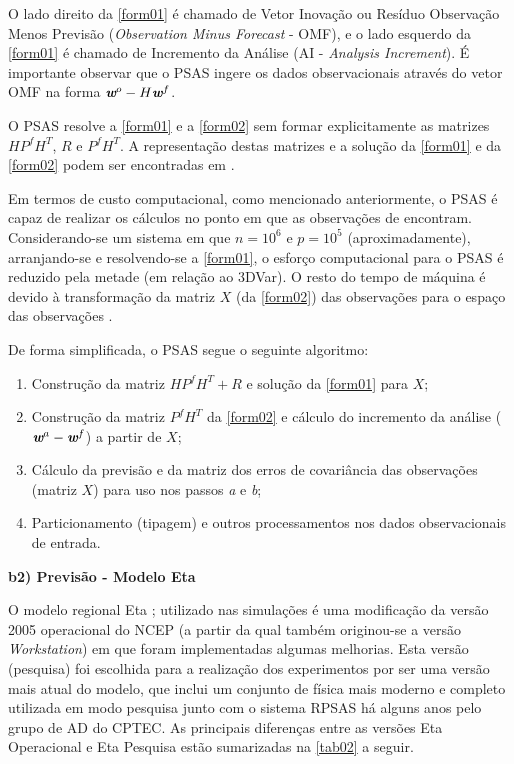 O lado direito da \autoref{form01} é chamado de Vetor Inovação ou Resíduo Observação Menos Previsão (\textit{Observation Minus Forecast} - OMF), e o lado esquerdo da \autoref{form01} é chamado de Incremento da Análise (AI - \textit{Analysis Increment}). É importante observar que o PSAS ingere os dados observacionais através do vetor OMF na forma $\textit{\textbf{w}}^o-H\textit{\textbf{w}}^f$.

O PSAS resolve a \autoref{form01} e a \autoref{form02} sem formar explicitamente as matrizes $HP^{f}H^{T}$, $R$ e $P^{f}H^{T}$. A representação destas matrizes e a solução da \autoref{form01} e da \autoref{form02} podem ser encontradas em .

Em termos de custo computacional, como mencionado anteriormente, o PSAS é capaz de realizar os cálculos no ponto em que as observações de encontram. Considerando-se um sistema em que $n=10^{6}$ e $p=10^{5}$ (aproximadamente), arranjando-se e resolvendo-se a \autoref{form01}, o esforço computacional para o PSAS é reduzido pela metade (em relação ao 3DVar). O resto do tempo de máquina é devido à transformação da matriz $X$ (da \autoref{form02}) das observações para o espaço das observações \cite{cohnetal98}.

De forma simplificada, o PSAS segue o seguinte algoritmo:

\begin{enumerate}
\item Construção da matriz $HP^{f}H^{T}+R$ e solução da \autoref{form01} para $X$;
\item Construção da matriz $P^{f}H^{T}$ da \autoref{form02} e cálculo do incremento da análise ($\textit{\textbf{w}}^a-\textit{\textbf{w}}^f$) a partir de $X$;
\item Cálculo da previsão e da matriz dos erros de covariância das observações (matriz $X$) para uso nos passos \textit{a} e \textit{b};
\item Particionamento (tipagem) e outros processamentos nos dados observacionais de entrada.
\end{enumerate}

\textbf{b2) Previsão - Modelo Eta}

O modelo regional Eta \cite{mesingeretal88}; \cite{black94} utilizado nas simulações é uma modificação da versão 2005 operacional do NCEP (a partir da qual também originou-se a versão \textit{Workstation}) em que foram implementadas algumas melhorias. Esta versão (pesquisa) foi escolhida para a realização dos experimentos por ser uma versão mais atual do modelo, que inclui um conjunto de física mais moderno e completo utilizada em modo pesquisa junto com o sistema RPSAS há alguns anos pelo grupo de AD do CPTEC. As principais diferenças entre as versões Eta Operacional e Eta Pesquisa estão sumarizadas na \autoref{tab02} a seguir.

